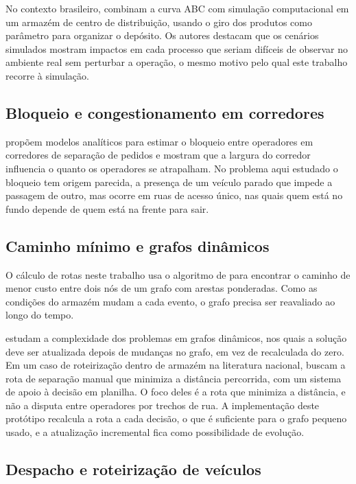\documentclass[
	article,
	11pt,
	oneside,
	a4paper,
	english,
	brazil,
	sumario=tradicional
	]{abntex2}
\begin{document}
No contexto brasileiro,  combinam a curva ABC com
simulação computacional em um armazém de centro de distribuição, usando o giro
dos produtos como parâmetro para organizar o depósito. Os autores destacam que
os cenários simulados mostram impactos em cada processo que seriam difíceis de
observar no ambiente real sem perturbar a operação, o mesmo motivo pelo qual
este trabalho recorre à simulação.

\subsection{Bloqueio e congestionamento em corredores}

 propõem modelos analíticos para estimar o bloqueio
entre operadores em corredores de separação de pedidos e mostram que a largura
do corredor influencia o quanto os operadores se atrapalham. No problema aqui
estudado o bloqueio tem origem parecida, a presença de um veículo parado que
impede a passagem de outro, mas ocorre em ruas de acesso único, nas quais quem
está no fundo depende de quem está na frente para sair.

\subsection{Caminho mínimo e grafos dinâmicos}

O cálculo de rotas neste trabalho usa o algoritmo de 
para encontrar o caminho de menor custo entre dois nós de um grafo com arestas
ponderadas. Como as condições do armazém mudam a cada evento, o grafo precisa
ser reavaliado ao longo do tempo.

 estudam a complexidade dos problemas em grafos
dinâmicos, nos quais a solução deve ser atualizada depois de mudanças no grafo,
em vez de recalculada do zero. Em um caso de roteirização dentro de armazém na
literatura nacional,  buscam a rota de separação manual
que minimiza a distância percorrida, com um sistema de apoio à decisão em
planilha. O foco deles é a rota que minimiza a distância, e não a disputa entre
operadores por trechos de rua. A implementação deste protótipo recalcula a rota
a cada decisão, o que é suficiente para o grafo pequeno usado, e a atualização
incremental fica como possibilidade de evolução.

\subsection{Despacho e roteirização de veículos}
\end{document}

